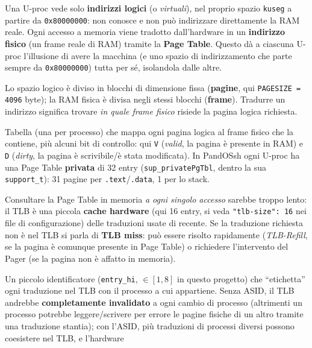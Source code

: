 \documentclass[11pt,a4paper]{article}
\newcommand{\code}[1]{\texttt{#1}}
\begin{document}
\begin{description}[style=nextline,leftmargin=0pt]
\item[Indirizzo logico vs fisico] Una U-proc vede solo \textbf{indirizzi
  logici} (o \emph{virtuali}), nel proprio spazio \code{kuseg} a partire da
  \code{0x80000000}: non conosce e non può indirizzare direttamente la RAM
  reale. Ogni accesso a memoria viene tradotto dall'hardware in un
  \textbf{indirizzo fisico} (un frame reale di RAM) tramite la
  \textbf{Page Table}. Questo dà a ciascuna U-proc l'illusione di avere la
  macchina (e uno spazio di indirizzamento che parte sempre da
  \code{0x80000000}) tutta per sé, isolandola dalle altre.
\item[Pagina e frame] Lo spazio logico è diviso in blocchi di dimensione
  fissa (\textbf{pagine}, qui \code{PAGESIZE = 4096} byte); la RAM fisica è
  divisa negli stessi blocchi (\textbf{frame}). Tradurre un indirizzo
  significa trovare \emph{in quale frame fisico} risiede la pagina logica
  richiesta.
\item[Page Table] Tabella (una per processo) che mappa ogni pagina logica al
  frame fisico che la contiene, più alcuni bit di controllo: qui
  \code{V} (\emph{valid}, la pagina è presente in RAM) e \code{D}
  (\emph{dirty}, la pagina è scrivibile/è stata modificata). In PandOSsh
  ogni U-proc ha una Page Table \textbf{privata} di 32 entry
  (\code{sup\_privatePgTbl}, dentro la sua \code{support\_t}): 31 pagine
  per \code{.text}/\code{.data}, 1 per lo stack.
\item[TLB (Translation Lookaside Buffer)] Consultare la Page Table in
  memoria \emph{a ogni singolo accesso} sarebbe troppo lento: il TLB è una
  piccola \textbf{cache hardware} (qui 16 entry, si veda
  \code{"tlb-size": 16} nei file di configurazione) delle traduzioni usate
  di recente. Se la traduzione richiesta non è nel TLB si parla di
  \textbf{TLB miss}: può essere risolto rapidamente (\emph{TLB-Refill}, se
  la pagina è comunque presente in Page Table) o richiedere l'intervento
  del Pager (se la pagina non è affatto in memoria).
\item[ASID (Address Space Identifier)] Un piccolo identificatore
  (\code{entry\_hi}, $\in[1,8]$ in questo progetto) che ``etichetta'' ogni
  traduzione nel TLB con il processo a cui appartiene. Senza ASID, il TLB
  andrebbe \textbf{completamente invalidato} a ogni cambio di processo
  (altrimenti un processo potrebbe leggere/scrivere per errore le pagine
  fisiche di un altro tramite una traduzione stantia); con l'ASID, più
  traduzioni di processi diversi possono coesistere nel TLB, e l'hardware

\end{description}
\end{document}
